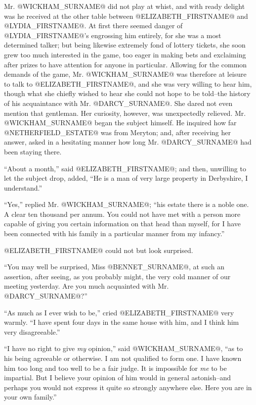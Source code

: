Mr. @WICKHAM_SURNAME@ did not play at whist, and with ready delight was he
received at the other table between @ELIZABETH_FIRSTNAME@ and @LYDIA_FIRSTNAME@. At first there
seemed danger of @LYDIA_FIRSTNAME@'s engrossing him entirely, for she was a most
determined talker; but being likewise extremely fond of lottery tickets,
she soon grew too much interested in the game, too eager in making bets
and exclaiming after prizes to have attention for anyone in particular.
Allowing for the common demands of the game, Mr. @WICKHAM_SURNAME@ was therefore
at leisure to talk to @ELIZABETH_FIRSTNAME@, and she was very willing to hear
him, though what she chiefly wished to hear she could not hope to be
told--the history of his acquaintance with Mr. @DARCY_SURNAME@. She dared not
even mention that gentleman. Her curiosity, however, was unexpectedly
relieved. Mr. @WICKHAM_SURNAME@ began the subject himself. He inquired how far
@NETHERFIELD_ESTATE@ was from Meryton; and, after receiving her answer, asked in
a hesitating manner how long Mr. @DARCY_SURNAME@ had been staying there.

``About a month,'' said @ELIZABETH_FIRSTNAME@; and then, unwilling to let the subject
drop, added, ``He is a man of very large property in Derbyshire, I
understand.''

``Yes,'' replied Mr. @WICKHAM_SURNAME@; ``his estate there is a noble one. A clear
ten thousand per annum. You could not have met with a person more
capable of giving you certain information on that head than myself, for
I have been connected with his family in a particular manner from my
infancy.''

@ELIZABETH_FIRSTNAME@ could not but look surprised.

``You may well be surprised, Miss @BENNET_SURNAME@, at such an assertion, after
seeing, as you probably might, the very cold manner of our meeting
yesterday. Are you much acquainted with Mr. @DARCY_SURNAME@?''

``As much as I ever wish to be,'' cried @ELIZABETH_FIRSTNAME@ very warmly. ``I have
spent four days in the same house with him, and I think him very
disagreeable.''

``I have no right to give \textit{my} opinion,'' said @WICKHAM_SURNAME@, ``as to his being
agreeable or otherwise. I am not qualified to form one. I have known him
too long and too well to be a fair judge. It is impossible for \textit{me}
to be impartial. But I believe your opinion of him would in general
astonish--and perhaps you would not express it quite so strongly
anywhere else. Here you are in your own family.''

